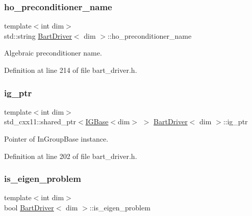 \subsubsection{\texorpdfstring{ho\+\_\+preconditioner\+\_\+name}{ho\_preconditioner\_name}}
{\footnotesize\ttfamily template$<$int dim$>$ \\
std\+::string \hyperlink{class_bart_driver}{Bart\+Driver}$<$ dim $>$\+::ho\+\_\+preconditioner\+\_\+name\hspace{0.3cm}{\ttfamily [private]}}



Algebraic preconditioner name. 



Definition at line 214 of file bart\+\_\+driver.\+h.

\mbox{\label{class_bart_driver_a83323d9561c906f6094a51a5c936cea4}} 
\subsubsection{\texorpdfstring{ig\+\_\+ptr}{ig\_ptr}}
{\footnotesize\ttfamily template$<$int dim$>$ \\
std\+\_\+cxx11\+::shared\+\_\+ptr$<$\hyperlink{class_i_g_base}{I\+G\+Base}$<$dim$>$ $>$ \hyperlink{class_bart_driver}{Bart\+Driver}$<$ dim $>$\+::ig\+\_\+ptr\hspace{0.3cm}{\ttfamily [private]}}



Pointer of In\+Group\+Base instance. 



Definition at line 202 of file bart\+\_\+driver.\+h.

\mbox{\label{class_bart_driver_a6ee26434a788284182df94da5d71ca12}} 
\subsubsection{\texorpdfstring{is\+\_\+eigen\+\_\+problem}{is\_eigen\_problem}}
{\footnotesize\ttfamily template$<$int dim$>$ \\
bool \hyperlink{class_bart_driver}{Bart\+Driver}$<$ dim $>$\+::is\+\_\+eigen\+\_\+problem\hspace{0.3cm}{\ttfamily [private]}}



